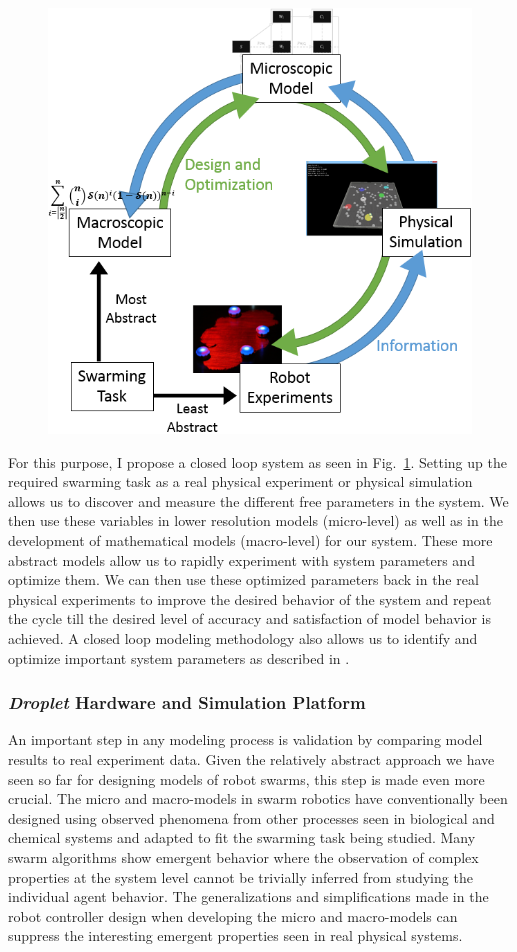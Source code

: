 \documentclass[11pt, onecolumn, compsoc, letterpaper]{article}
\begin{document}
\begin{figure}[!htb]
	\centering\includegraphics[width=.75\textwidth]{../assets/ssmodel.png}
	\centering\caption{}\label{fig:ssmodel}
\end{figure}

For this purpose, I propose a closed loop system as seen in Fig.~\ref{fig:ssmodel}. Setting up the required swarming task as a real physical experiment or physical simulation allows us to discover and measure the different free parameters in the system. We then use these variables in lower resolution models (micro-level) as well as in the development of mathematical models (macro-level) for our system. These more abstract models allow us to rapidly experiment with system parameters and optimize them. We can then use these optimized parameters back in the real physical experiments to improve the desired behavior of the system and repeat the cycle till the desired level of accuracy and satisfaction of model behavior is achieved. A closed loop modeling methodology also allows us to identify and optimize important system parameters as described in \cite{Correll2006a,Correll2008}.

\subsubsection{\emph{Droplet} Hardware and Simulation Platform}
An important step in any modeling process is validation by comparing model results to real experiment data. Given the relatively abstract approach we have seen so far for designing models of robot swarms, this step is made even more crucial. The micro and macro-models in swarm robotics have conventionally been designed using observed phenomena from other processes seen in biological and chemical systems and adapted to fit the swarming task being studied. Many swarm algorithms show emergent behavior where the observation of complex properties at the system level cannot be trivially inferred from studying the individual agent behavior. The generalizations and simplifications made in the robot controller design when developing the micro and macro-models can suppress the interesting emergent properties seen in real physical systems.
\end{document}

